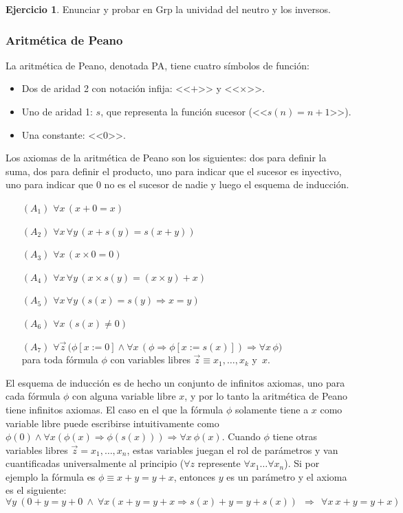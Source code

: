 \documentclass[a4paper, 12pt]{report}
\newcommand{\Ra}{\Rightarrow}
\theoremstyle{definition}
\newtheorem{ejercicio}{Ejercicio}[section]
\begin{document}
\begin{ejercicio}
	Enunciar y probar en Grp la unividad del neutro y los inversos.
\end{ejercicio}

\subsubsection{Aritmética de Peano}

La aritmética de Peano, denotada PA, tiene cuatro símbolos de función:
\begin{itemize}
	\item Dos de aridad 2 con notación infija: <<$+$>> y <<$\times$>>.
	\item Uno de aridad 1: $s$, que representa la función sucesor (<<$s(n)=n+1$>>).
	\item Una constante: <<$0$>>.
\end{itemize}

Los axiomas de la aritmética de Peano son los siguientes: dos para definir la suma, dos para definir el producto, uno para indicar que el sucesor es inyectivo, uno para indicar que $0$ no es el sucesor de nadie y luego el esquema de inducción.
\begin{enumerate}\parskip-.5ex
	\item[$(A_1)$] $\forall x\,(x+0=x)$
	\item[$(A_2)$] $\forall x\,\forall y\,(x+s(y)=s(x+y))$
	\item[$(A_3)$] $\forall x\,(x\times 0=0)$
	\item[$(A_4)$] $\forall x\,\forall y\,(x\times s(y)=(x\times y)+x)$
	\item[$(A_5)$] $\forall x\,\forall y\,(s(x)=s(y)\Ra x=y)$
	\item[$(A_6)$] $\forall x\,(s(x)\neq 0)$
	\item[$(A_7)$] $\forall\vec{z}\,\bigl(\phi[x:=0]\land
	\forall x\,(\phi\Ra\phi[x:=s(x)])\Ra\forall x\,\phi\bigr)$\\
	para toda fórmula $\phi$ con variables libres
	$\vec{z}\equiv x_1,\ldots,x_k$ y~$x$.
\end{enumerate}
El esquema de inducción es de hecho un conjunto de infinitos axiomas, uno para cada fórmula $\phi$ con alguna variable libre $x$, y por lo tanto la aritmética de Peano tiene infinitos axiomas. El caso en el que la fórmula $\phi$ solamente tiene a $x$ como variable libre puede escribirse intuitivamente como $\phi(0)\wedge\forall x(\phi(x)\Ra\phi(s(x)))\Ra\forall x~\phi(x)$. Cuando $\phi$ tiene otras variables libres $\vec{z}=x_1,\dots,x_n$, estas variables juegan el rol de parámetros y van cuantificadas universalmente al principio ($\forall z$ represente $\forall x_1\dots\forall x_n$). Si por ejemplo la fórmula es $\phi\equiv x+y=y+x$, entonces $y$ es un parámetro y el axioma es el siguiente: 
$$\forall y~(0+y=y+0~\wedge~\forall x(x+y=y+x\Ra s(x)+y=y+s(x))~~\Ra~~\forall x~x+y=y+x)$$
\end{document}
